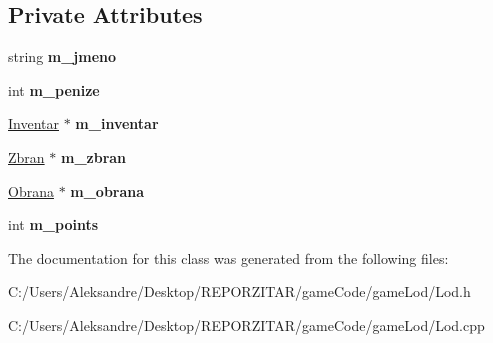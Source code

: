 \subsection*{Private Attributes}
\begin{DoxyCompactItemize}
\item 
\mbox{\label{class_lod_a3dd4ef9f76c3bb8be2124e9e4635fa54}} 
string {\bfseries m\+\_\+jmeno}
\item 
\mbox{\label{class_lod_a00b427208117bc26fe1e2cf615947c1f}} 
int {\bfseries m\+\_\+penize}
\item 
\mbox{\label{class_lod_ae034f4b648c8a81b9e6a7cff1f375ff6}} 
\hyperlink{class_inventar}{Inventar} $\ast$ {\bfseries m\+\_\+inventar}
\item 
\mbox{\label{class_lod_a7f8041f4b1c3615aa73961dc0d712740}} 
\hyperlink{class_zbran}{Zbran} $\ast$ {\bfseries m\+\_\+zbran}
\item 
\mbox{\label{class_lod_a3ec69d6d3196caf3346b9424272a856b}} 
\hyperlink{class_obrana}{Obrana} $\ast$ {\bfseries m\+\_\+obrana}
\item 
\mbox{\label{class_lod_ab01fba39d651c7de2eeae5964b20fbf7}} 
int {\bfseries m\+\_\+points}
\end{DoxyCompactItemize}


The documentation for this class was generated from the following files\+:\begin{DoxyCompactItemize}
\item 
C\+:/\+Users/\+Aleksandre/\+Desktop/\+R\+E\+P\+O\+R\+Z\+I\+T\+A\+R/game\+Code/game\+Lod/Lod.\+h\item 
C\+:/\+Users/\+Aleksandre/\+Desktop/\+R\+E\+P\+O\+R\+Z\+I\+T\+A\+R/game\+Code/game\+Lod/Lod.\+cpp\end{DoxyCompactItemize}
